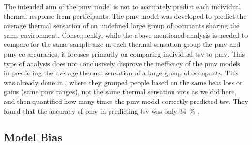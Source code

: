 The intended aim of the \ac{pmv} model is not to accurately predict each individual thermal response from participants.
The \ac{pmv} model was developed to predict the average thermal sensation of an undefined large group of occupants sharing the same environment.
Consequently, while the above-mentioned analysis is needed to compare for the same sample size in each thermal sensation group the \ac{pmv} and \ac{pmv-ce} accuracies, it focuses primarily on comparing individual \ac{tsv} to \ac{pmv}.
This type of analysis does not conclusively disprove the inefficacy of the \ac{pmv} models in predicting the average thermal sensation of a large group of occupants.
This was already done in , where they grouped people based on the same heat loss or gains (same \ac{pmv} ranges), not the same thermal sensation vote as we did here, and then quantified how many times the \ac{pmv} model correctly predicted \ac{tsv}.
They found that the accuracy of \ac{pmv} in predicting \ac{tsv} was only \qty{34}{\percent} . 

\subsection{Model Bias}\label{sec:model-bias}

